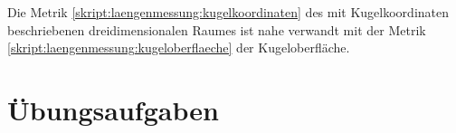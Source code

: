 Die Metrik 
\eqref{skript:laengenmessung:kugelkoordinaten}
des mit Kugelkoordinaten beschriebenen dreidimensionalen Raumes
ist nahe verwandt mit der Metrik
\eqref{skript:laengenmessung:kugeloberflaeche}
der Kugeloberfläche.



\section{Übungsaufgaben}


